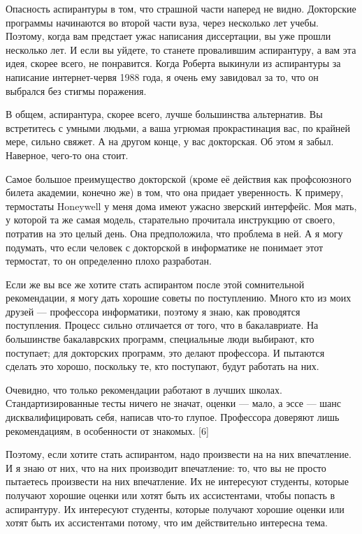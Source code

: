 \documentclass[ebook,12pt,oneside,openany]{memoir}
\begin{document}
Опасность аспирантуры в том, что страшной части наперед не видно.
Докторские программы начинаются во второй части вуза, через несколько
лет учебы. Поэтому, когда вам предстает ужас написания диссертации, вы
уже прошли несколько лет. И если вы уйдете, то станете провалившим
аспирантуру, а вам эта идея, скорее всего, не понравится. Когда
Роберта выкинули из аспирантуры за написание интернет-червя 1988 года,
я очень ему завидовал за то, что он выбрался без стигмы поражения.

В общем, аспирантура, скорее всего, лучше большинства альтернатив. Вы
встретитесь с умными людьми, а ваша угрюмая прокрастинация вас, по
крайней мере, сильно свяжет. А на другом конце, у вас докторская. Об
этом я забыл. Наверное, чего-то она стоит.

Самое большое преимущество докторской (кроме её действия как
профсоюзного билета академии, конечно же) в том, что она придает
уверенность. К примеру, термостаты Honeywell у меня дома имеют ужасно
зверский интерфейс. Моя мать, у которой та же самая модель,
старательно прочитала инструкцию от своего, потратив на это целый
день. Она предположила, что проблема в ней. А я могу подумать, что
если человек с докторской в информатике не понимает этот термостат, то
он определенно плохо разработан.

Если же вы все же хотите стать аспирантом после этой сомнительной
рекомендации, я могу дать хорошие советы по поступлению. Много кто из
моих друзей — профессора информатики, поэтому я знаю, как проводятся
поступления. Процесс сильно отличается от того, что в бакалавриате. На
большинстве бакалаврских программ, специальные люди выбирают, кто
поступает; для докторских программ, это делают профессора. И пытаются
сделать это хорошо, поскольку те, кто поступают, будут работать на
них.

Очевидно, что только рекомендации работают в лучших школах.
Стандартизированные тесты ничего не значат, оценки — мало, а эссе —
шанс дисквалифицировать себя, написав что-то глупое. Профессора
доверяют лишь рекомендациям, в особенности от знакомых. [6]

Поэтому, если хотите стать аспирантом, надо произвести на на них
впечатление. И я знаю от них, что на них производит впечатление: то,
что вы не просто пытаетесь произвести на них впечатление. Их не
интересуют студенты, которые получают хорошие оценки или хотят быть их
ассистентами, чтобы попасть в аспирантуру. Их интересуют студенты,
которые получают хорошие оценки или хотят быть их ассистентами потому,
что им действительно интересна тема.
\end{document}
